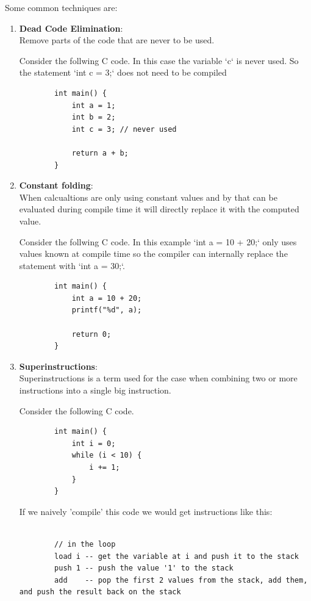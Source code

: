 \documentclass{article}
\begin{document}
Some common techniques are:
\begin{enumerate}
    \item \textbf{Dead Code Elimination}:\\
    \label{item:dead_code_elimination}
        Remove parts of the code that are never to be used.

        Consider the follwing C code. In this case the variable `c` is never
        used. So the statement `int c = 3;` does not need to be compiled
        \begin{verbatim}
        int main() {
            int a = 1;
            int b = 2;
            int c = 3; // never used

            return a + b;
        }
        \end{verbatim}
    \item \textbf{Constant folding}:\\
        When calcualtions are only using constant values and by that can be
        evaluated during compile time it will directly replace it with the
        computed value.

        Consider the follwing C code. In this example `int a = 10 + 20;` only uses values known
        at compile time so the compiler can internally replace the statement with `int a = 30;`.
        \begin{verbatim}
        int main() {
            int a = 10 + 20;
            printf("%d", a);

            return 0;
        }
        \end{verbatim}
    \item \textbf{Superinstructions}:\\
        Superinstructions is a term used for the case when combining two or more instructions 
        into a single big instruction.

        Consider the following C code.

        \begin{verbatim}
        int main() {
            int i = 0;
            while (i < 10) {
                i += 1;
            }
        }
        \end{verbatim}

        If we naively 'compile' this code we would get instructions like this:

        \begin{verbatim}

        // in the loop
        load i -- get the variable at i and push it to the stack
        push 1 -- push the value '1' to the stack
        add    -- pop the first 2 values from the stack, add them, and push the result back on the stack


\end{verbatim}
\end{enumerate}
\end{document}
